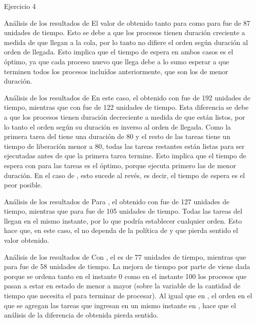 \begin{section}{Ejercicio 4}
\begin{subsection}{Análisis de los resultados de }
	El valor de  obtenido tanto para  como para  fue de 87 unidades de tiempo. Esto se debe a que los procesos tienen duración creciente a medida de que llegan a la cola, por lo tanto no difiere el orden según duración al orden de llegada. Esto implica que el tiempo de espera en ambos casos es el óptimo, ya que cada proceso nuevo que llega debe a lo sumo esperar a que terminen todos los procesos incluídos anteriormente, que son los de menor duración.
\end{subsection}

\begin{subsection}{Análisis de los resultados de }
	En este caso, el  obtenido con  fue de 192 unidades de tiempo, mientras que con  fue de 122 unidades de tiempo. Esta diferencia se debe a que los procesos tienen duración decreciente a medida de que están listos, por lo tanto el orden según su duración es inverso al orden de llegada. Como la primera tarea del  tiene una duración de 80 y el resto de las tareas tiene un tiempo de liberación menor a 80, todas las tareas restantes están listas para ser ejecutadas antes de que la primera tarea termine. Esto implica que el tiempo de espera con  para las tareas es el óptimo, porque ejecuta primero las de menor duración. En el caso de , esto sucede al revés, es decir, el tiempo de espera es el peor posible.
\end{subsection}

\begin{subsection}{Análisis de los resultados de }
	Para , el  obtenido con  fue de 127 unidades de tiempo, mientras que para  fue de 105 unidades de tiempo. Todas las tareas del  llegan en el mismo instante, por lo que  podría establecer cualquier orden. Esto hace que, en este caso, el  no dependa de la política de  y que pierda sentido el valor obtenido.
\end{subsection}

\begin{subsection}{Análisis de los resultados de }
	Con , el  es de 77 unidades de tiempo, mientras que para  fue de 58 unidades de tiempo. La mejora de tiempo por parte de  viene dada porque se ordena tanto en el instante 0 como en el instante 100 los procesos que pasan a estar en estado  de menor a mayor (sobre la variable de la cantidad de tiempo que necesita el  para terminar de procesar). Al igual que en , el orden en el que se agregan las tareas que ingresan en un mismo instante en , hace que el análisis de la diferencia de  obtenida pierda sentido.
\end{subsection}


\end{section}
